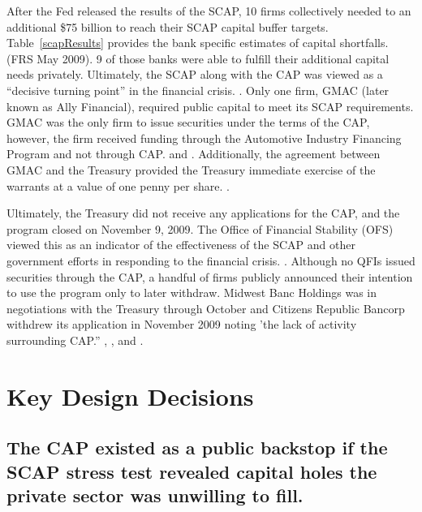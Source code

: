 \documentclass[12pt]{article}
\begin{document}
After the Fed released the results of the SCAP, 10 firms collectively needed to an additional \$75 billion to reach their SCAP capital buffer targets. Table~\ref{scapResults} provides the bank specific estimates of capital shortfalls. (FRS May 2009). 9 of those banks were able to fulfill their additional capital needs privately. Ultimately, the SCAP along with the CAP was viewed as a ``decisive turning point'' in the financial crisis. \citep{Bernanke}. Only one firm, GMAC (later known as Ally Financial), required public capital to meet its SCAP requirements. GMAC was the only firm to issue securities under the terms of the CAP, however, the firm received funding through the Automotive Industry Financing Program and not through CAP. \citep{OFS} and \citep{GW}. Additionally, the agreement between GMAC and the Treasury provided the Treasury immediate exercise of the warrants at a value of one penny per share. \citep{GW}.

Ultimately, the Treasury did not receive any applications for the CAP, and the program closed on November 9, 2009. The Office of Financial Stability (OFS) viewed this as an indicator of the effectiveness of the SCAP and other government efforts in responding to the financial crisis. \citep{OFS}. Although no QFIs issued securities through the CAP, a handful of firms publicly announced their intention to use the program only to later withdraw. Midwest Banc Holdings was in negotiations with the Treasury through October and Citizens Republic Bancorp withdrew its application in November 2009 noting 'the lack of activity surrounding CAP.'' \citep{GW}, \citep{Citizens}, and \citep{Midwest}.

\newpage
\section{Key Design Decisions}

\subsection{The CAP existed as a public backstop if the SCAP stress test revealed capital holes the private sector was unwilling to fill.}
\end{document}
